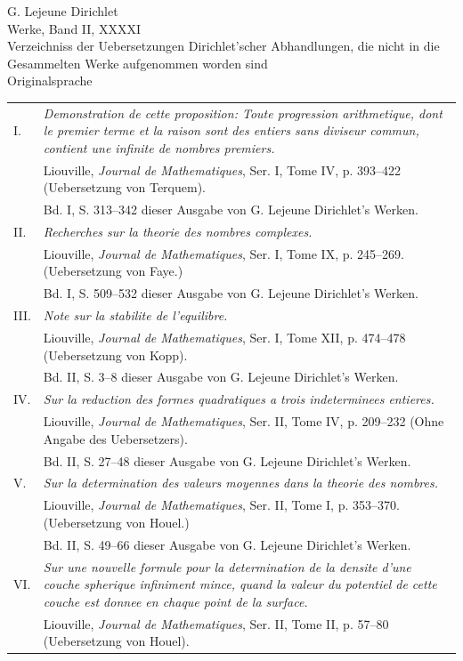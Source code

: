 \documentclass[11pt]{article}
\newcommand{\paperhead}[3]{\begin{center}{\Large G. Lejeune Dirichlet}\\[0.25em]{\large Werke, Band II, #1}\\[0.75em]{\LARGE #2}\\[0.35em]{\large #3}\end{center}\bigskip}
\begin{document}
\paperhead{XXXXI}{Verzeichniss der Uebersetzungen Dirichlet'scher Abhandlungen, die nicht in die Gesammelten Werke aufgenommen worden sind}{Originalsprache}

\begin{longtable}{@{}p{}p{}@{}}
I. & \emph{Demonstration de cette proposition: Toute progression arithmetique, dont le premier terme et la raison sont des entiers sans diviseur commun, contient une infinite de nombres premiers.}\\
& Liouville, \emph{Journal de Mathematiques}, Ser. I, Tome IV, p. 393--422 (Uebersetzung von Terquem).\\
& Bd. I, S. 313--342 dieser Ausgabe von G. Lejeune Dirichlet's Werken.\\[0.45em]
II. & \emph{Recherches sur la theorie des nombres complexes.}\\
& Liouville, \emph{Journal de Mathematiques}, Ser. I, Tome IX, p. 245--269. (Uebersetzung von Faye.)\\
& Bd. I, S. 509--532 dieser Ausgabe von G. Lejeune Dirichlet's Werken.\\[0.45em]
III. & \emph{Note sur la stabilite de l'equilibre.}\\
& Liouville, \emph{Journal de Mathematiques}, Ser. I, Tome XII, p. 474--478 (Uebersetzung von Kopp).\\
& Bd. II, S. 3--8 dieser Ausgabe von G. Lejeune Dirichlet's Werken.\\[0.45em]
IV. & \emph{Sur la reduction des formes quadratiques a trois indeterminees entieres.}\\
& Liouville, \emph{Journal de Mathematiques}, Ser. II, Tome IV, p. 209--232 (Ohne Angabe des Uebersetzers).\\
& Bd. II, S. 27--48 dieser Ausgabe von G. Lejeune Dirichlet's Werken.\\[0.45em]
V. & \emph{Sur la determination des valeurs moyennes dans la theorie des nombres.}\\
& Liouville, \emph{Journal de Mathematiques}, Ser. II, Tome I, p. 353--370. (Uebersetzung von Houel.)\\
& Bd. II, S. 49--66 dieser Ausgabe von G. Lejeune Dirichlet's Werken.\\[0.45em]
VI. & \emph{Sur une nouvelle formule pour la determination de la densite d'une couche spherique infiniment mince, quand la valeur du potentiel de cette couche est donnee en chaque point de la surface.}\\
& Liouville, \emph{Journal de Mathematiques}, Ser. II, Tome II, p. 57--80 (Uebersetzung von Houel).\\

\end{longtable}
\end{document}
